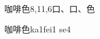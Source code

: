 \begin{entry}{咖啡色}{8,11,6}{⼝、⼝、⾊}
  \begin{phonetics}{咖啡色}{ka1fei1 se4}
  \end{phonetics}
\end{entry}

